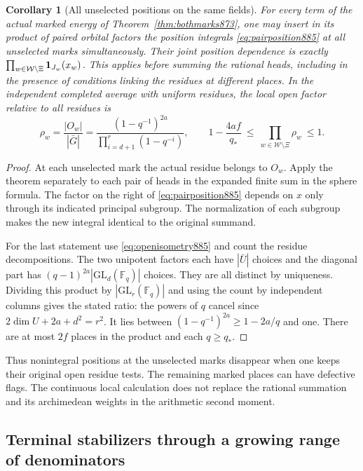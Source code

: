 \documentclass[a4paper,11pt]{article}
\newtheorem{corollary}[proposition]{Corollary}
\theoremstyle{definition}
\theoremstyle{remark}
\numberwithin{equation}{section}
\begin{document}
\begin{corollary}[All unselected positions on the same fields]
\leavevmode\label{cor:unusedposition885}
For every term of the actual marked energy of
Theorem~\ref{thm:bothmarks873}, one may insert in its product of
paired orbital factors the position integrals
\eqref{eq:pairposition885} at all unselected marks simultaneously.
Their joint position dependence is exactly
\(\prod_{w\in\mathcal W\setminus\Xi}{\bf1}_{J_w}(x_w)\).
This applies before summing the rational heads, including in the
presence of conditions linking the residues at different places.
In the independent completed average with uniform residues, the
local open factor relative to all residues is
\[
 \rho_w=\frac{|O_w|}{|\bar G|}
       =\frac{(1-q^{-1})^{2a}}{\prod_{i=d+1}^{r}(1-q^{-i})},
 \qquad
 1-\frac{4af}{q_*}\ \le\
     \prod_{w\in\mathcal W\setminus\Xi}\rho_w\ \le 1 .
\]
\end{corollary}
\begin{proof}
At each unselected mark the actual residue belongs to \(O_w\).
Apply the theorem separately to each pair of heads in the
expanded finite sum in the sphere formula. The factor on the
right of \eqref{eq:pairposition885} depends on \(x\) only through
its indicated principal subgroup. The normalization of each
subgroup makes the new integral identical to the original
summand.

For the last statement use \eqref{eq:openisometry885} and count
the residue decompositions. The two unipotent factors each have
\(|\bar U|\) choices and the diagonal part has
\((q-1)^{2a}|\mathrm{GL}_d(\mathbb F_q)|\) choices. They are all
distinct by uniqueness. Dividing this product by
\(|\mathrm{GL}_r(\mathbb F_q)|\) and using the count by independent
columns gives the stated ratio: the powers of \(q\) cancel since
\(2\dim U+2a+d^2=r^2\). It lies between
\((1-q^{-1})^{2a}\ge1-2a/q\) and one. There are at most \(2f\)
places in the product and each \(q\ge q_*\).
\end{proof}

Thus nonintegral positions at the unselected marks disappear when
one keeps their original open residue tests. The remaining marked
places can have defective flags. The continuous local calculation
does not replace the rational summation and its archimedean
weights in the arithmetic second moment.
\clearpage

\subsection{Terminal stabilizers through a growing range of denominators}
\label{sec:terminalrange886}
\end{document}

